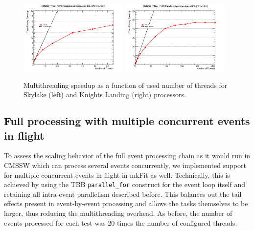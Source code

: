 \documentclass{webofc}
\def\mkfit{mkFit\xspace}
\def\stt#1{{\small\texttt{#1}}}
\def\twop{0.48\textwidth}
\def\postfigskip{\vskip-4mm}
\begin{document}
\begin{figure}[htb]
  \centering
  \includegraphics[width=\twop]{figs/comp/SKL-SP_CMSSW_TTbar_PU70_TH_speedup.png}
  \hfill
  \includegraphics[width=\twop]{figs/comp/KNL_CMSSW_TTbar_PU70_TH_speedup.png}
  \postfigskip

  \caption{Multithreading speedup as a function of used number of threads for
    Skylake (left) and Knights Landing (right) processors.}
  \label{fig:th-speedup}
\end{figure}


\subsection{Full processing with multiple concurrent events in flight}

To assess the scaling behavior of the full event processing chain as it would
run in CMSSW which can process several events concurrently, we implemented
support for multiple concurrent events in flight in \mkfit as well.
Technically, this is achieved by using the TBB \stt{parallel\_for} construct
for the event loop itself and retaining all intra-event parallelism described before. This
balances out the tail effects present in event-by-event processing and allows
the tasks themselves to be larger, thus reducing the multithreading overhead. As before, the
number of events processed for each test was 20 times the number of configured threads.
\end{document}
